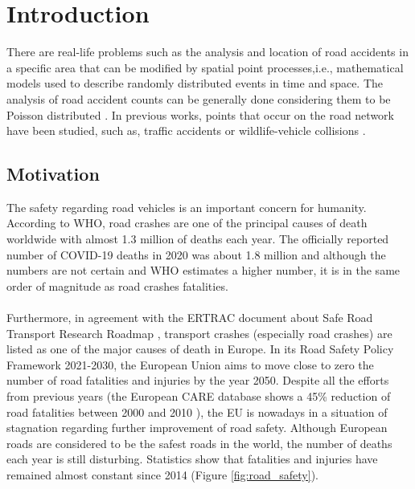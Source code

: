 \chapter{Introduction} \label{ch:intro}
There are real-life problems such as the analysis and location of road accidents in a specific area that can be modified by spatial point processes,i.e., mathematical models used to describe randomly distributed events in time and space. The analysis of road accident counts can be generally done considering them to be Poisson distributed \cite{car-poisson}. In previous works, points that occur on the road network have been studied, such as, traffic accidents \cite{yamada} or wildlife-vehicle collisions \cite{borrajo}.

\section{Motivation}
    The safety regarding road vehicles is an important concern for humanity. According to \ac{WHO}, road crashes are one of the principal causes of death worldwide with almost 1.3 million \cite{who} of deaths each year. The officially reported number of COVID-19 deaths in 2020 was about 1.8 million \cite{covid} and although the numbers are not certain and \ac{WHO} estimates a higher number, it is in the same order of magnitude as road crashes fatalities.
    \\
    \\
    Furthermore, in agreement with the \ac{ERTRAC} document about Safe Road Transport Research Roadmap \cite{ertrac}, transport crashes (especially road crashes) are listed as one of the major causes of death in Europe. In its Road Safety Policy Framework 2021-2030, the European Union aims to move close to zero the number of road fatalities and injuries by the year 2050. Despite all the efforts from previous years (the European CARE database shows a 45\% reduction of road fatalities between 2000 and 2010 \cite{care}), the EU is nowadays in a situation of stagnation regarding further improvement of road safety. Although European roads are considered to be the safest roads in the world, the number of deaths each year is still disturbing.
    Statistics show \cite{ertrac} that fatalities and injuries have remained almost constant since 2014 (Figure \ref{fig:road_safety}). 
    \\
    \\
